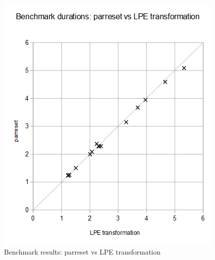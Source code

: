 \begin{figure}[!ht]
\begin{center}
\includegraphics[width=0.7\linewidth]{charts/parreset-vs-lpe-only}
\caption{Benchmark results: parreset vs LPE transformation}
\label{parreset-vs-lpe-only:fig}
\end{center}
\end{figure}


